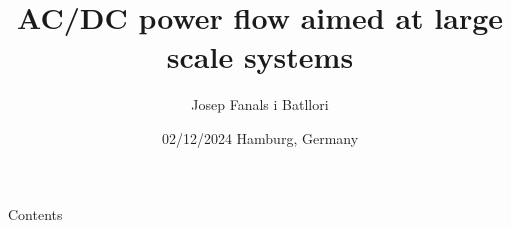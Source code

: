 \documentclass[aspectratio=169, 10pt]{beamer} %
\title{AC/DC power flow aimed at large scale systems}
\institute{\large{\textbf{Large Scale Systems Week} \\[2.5ex] {eRoots Analytics}}}
\date{02/12/2024 \newline Hamburg, Germany}
\author[Josep Fanals]{Josep Fanals i Batllori}
\begin{document}
\begin{frame}[plain]
\hspace*{-1.0cm}\parbox[t]{\textwidth}{
	\titlepage
    } 
\end{frame}

\begin{frame}{Contents}
	\footnotesize
	\tableofcontents
\end{frame}


% 
% 
% 
% 












\begin{frame}[plain]
\hspace*{-1.0cm}\parbox[t]{\textwidth}{
	\titlepage
    } 
\end{frame}

        
        
\end{document}
